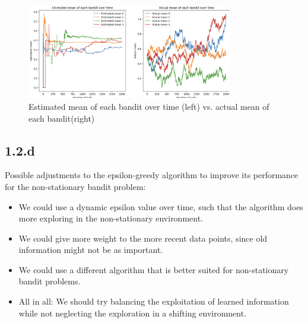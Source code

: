 \documentclass{article} %
\begin{document}
	\begin{figure}[h!]
		\centering
		\includegraphics[width=0.8\textwidth]{images/1.2.c.2}
		\caption{Estimated mean of each bandit over time (left) vs. actual mean of each bandit(right)}
		\label{fig:1.2.c.2}
		
	\end{figure}
	
	\newpage
	
	\subsection{1.2.d}
	Possible adjustments to the epsilon-greedy algorithm to improve its performance for the non-stationary bandit problem: 
	
	\begin{itemize}
		\item We could use a dynamic epsilon value over time, such that the algorithm does more exploring in the non-stationary environment. 
	 \item We could give more weight to the more recent data points, since old information might not be as important. 
	\item  We could use a different algorithm that is better suited for non-stationary bandit problems. 
	\item All in all: We should try balancing the exploitation of learned information while not neglecting the exploration in a shifting environment. 
\end{itemize}
\end{document}
